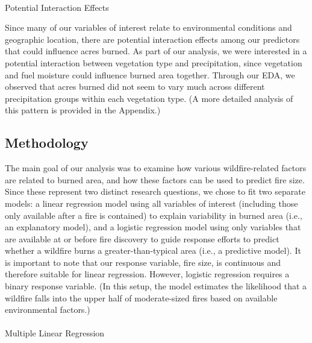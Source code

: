 \documentclass[
  letterpaper,
  DIV=11,
  numbers=noendperiod]{scrartcl}
\makeatletter
\let\oldparagraph\paragraph
\renewcommand{\paragraph}{
    \@ifstar
      \xxxParagraphStar
      \xxxParagraphNoStar
  }
\newcommand{\xxxParagraphStar}[1]{\oldparagraph*{#1}\mbox{}}
\newcommand{\xxxParagraphNoStar}[1]{\oldparagraph{#1}\mbox{}}
\makeatother
\begin{document}
\paragraph{Potential Interaction
Effects}\label{potential-interaction-effects}

Since many of our variables of interest relate to environmental
conditions and geographic location, there are potential interaction
effects among our predictors that could influence acres burned. As part
of our analysis, we were interested in a potential interaction between
vegetation type and precipitation, since vegetation and fuel moisture
could influence burned area together. Through our EDA, we observed that
acres burned did not seem to vary much across different precipitation
groups within each vegetation type. (A more detailed analysis of this
pattern is provided in the Appendix.)

\subsection{Methodology}\label{methodology}

The main goal of our analysis was to examine how various
wildfire-related factors are related to burned area, and how these
factors can be used to predict fire size. Since these represent two
distinct research questions, we chose to fit two separate models: a
linear regression model using all variables of interest (including those
only available after a fire is contained) to explain variability in
burned area (i.e., an explanatory model), and a logistic regression
model using only variables that are available at or before fire
discovery to guide response efforts to predict whether a wildfire burns
a greater-than-typical area (i.e., a predictive model). It is important
to note that our response variable, fire size, is continuous and
therefore suitable for linear regression. However, logistic regression
requires a binary response variable. (In this setup, the model estimates
the likelihood that a wildfire falls into the upper half of
moderate-sized fires based on available environmental factors.)

\paragraph{Multiple Linear Regression}\label{multiple-linear-regression}
\end{document}
